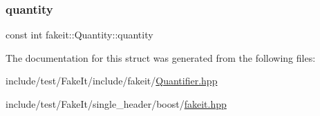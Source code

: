 \subsubsection{\texorpdfstring{quantity}{quantity}}
{\footnotesize\ttfamily const int fakeit\+::\+Quantity\+::quantity}



The documentation for this struct was generated from the following files\+:\begin{DoxyCompactItemize}
\item 
include/test/\+Fake\+It/include/fakeit/\mbox{\hyperlink{Quantifier_8hpp}{Quantifier.\+hpp}}\item 
include/test/\+Fake\+It/single\+\_\+header/boost/\mbox{\hyperlink{single__header_2boost_2fakeit_8hpp}{fakeit.\+hpp}}\end{DoxyCompactItemize}
